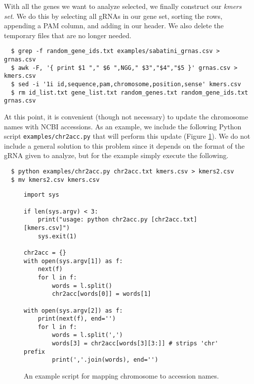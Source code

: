 \documentclass[11pt]{article}
\begin{document}
With all the genes we want to analyze selected, we finally construct
our {\it kmers set}. We do this by selecting all gRNAs in our gene
set, sorting the rows, appending a PAM column, and adding in
our header. We also delete the temporary files that are no longer
needed.

\begin{verbatim}
  $ grep -f random_gene_ids.txt examples/sabatini_grnas.csv > grnas.csv
  $ awk -F, '{ print $1 "," $6 ",NGG," $3","$4","$5 }' grnas.csv > kmers.csv
  $ sed -i '1i id,sequence,pam,chromosome,position,sense' kmers.csv
  $ rm id_list.txt gene_list.txt random_genes.txt random_gene_ids.txt grnas.csv
\end{verbatim}

At this point, it is convenient (though not necessary) to update the
chromosome names with NCBI accessions. As an example, we include the
following Python script \texttt{examples/chr2acc.py} that will perform
this update (Figure \ref{fig:chr2accpy}). We do not include a general
solution to this problem since it depends on the format of the gRNA
given to analyze, but for the example simply execute the following.

\begin{verbatim}
  $ python examples/chr2acc.py chr2acc.txt kmers.csv > kmers2.csv
  $ mv kmers2.csv kmers.csv
\end{verbatim}

\begin{figure}[ht]
  \centering
  \begin{verbatim}
import sys

if len(sys.argv) < 3:
    print("usage: python chr2acc.py [chr2acc.txt] [kmers.csv]")
    sys.exit(1)

chr2acc = {}
with open(sys.argv[1]) as f:
    next(f)
    for l in f:
        words = l.split() 
        chr2acc[words[0]] = words[1]

with open(sys.argv[2]) as f:
    print(next(f), end='')
    for l in f:
        words = l.split(',')
        words[3] = chr2acc[words[3][3:]] # strips 'chr' prefix
        print(','.join(words), end='')
  \end{verbatim}
  \caption{\label{fig:chr2accpy} An example script for mapping
    chromosome to accession names.}
\end{figure}
\end{document}
